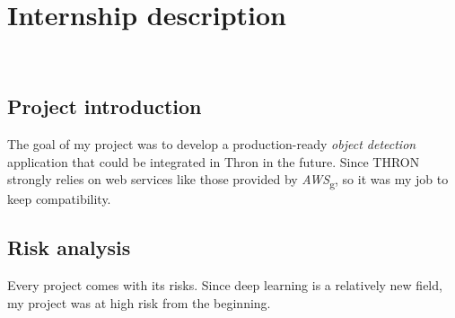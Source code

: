 
\chapter{Internship description}
\label{chap:internship-description}

\\

\section{Project introduction}
The goal of my project was to develop a production-ready \emph{object detection} application that could be integrated in Thron in the future. Since THRON strongly relies on web services like those provided by \emph{\gls{AWS}}\textsubscript{g}, so it was my job to keep compatibility.
\section{Risk analysis}

Every project comes with its risks. Since deep learning is a relatively new field, my project was at high risk from the beginning.\\

